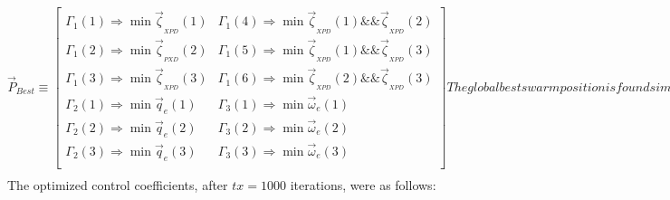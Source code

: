 \begin{subequations}
\begin{equation}
\vec{P}_{Best}\equiv
\begin{bmatrix}
\Gamma_1(1)\Rightarrow \min \vec{\zeta}_{_{XPD}}(1) & \Gamma_1(4)\Rightarrow\min\vec{\zeta}_{_{XPD}}(1)\&\& \vec{\zeta}_{_{XPD}}(2)\\
\Gamma_1(2)\Rightarrow \min \vec{\zeta}_{_{PXD}}(2) & \Gamma_1(5)\Rightarrow\min\vec{\zeta}_{_{XPD}}(1)\&\& \vec{\zeta}_{_{XPD}}(3)\\
\Gamma_1(3)\Rightarrow \min \vec{\zeta}_{_{XPD}}(3) & \Gamma_1(6)\Rightarrow\min\vec{\zeta}_{_{XPD}}(2)\&\& \vec{\zeta}_{_{XPD}}(3)\\
\Gamma_2(1)\Rightarrow \min \vec{q}_e(1) & \Gamma_3(1)\Rightarrow\min\vec{\omega}_e(1)\\
\Gamma_2(2)\Rightarrow \min \vec{q}_e(2) & \Gamma_3(2)\Rightarrow\min\vec{\omega}_e(2)\\
\Gamma_2(3)\Rightarrow \min \vec{q}_e(3) & \Gamma_3(3)\Rightarrow\min\vec{\omega}_e(3)\\
\end{bmatrix}
\end{equation}
The global best swarm position is found similarly:
\begin{equation}
\vec{G}_{Best}\equiv
\begin{bmatrix}
\Gamma_1(1)\Rightarrow \min \vec{\zeta}_{_{XPD}}(1) & \Gamma_1(4)\Rightarrow\min\vec{\zeta}_{_{XPD}}(1)\&\& \vec{\zeta}_{_{XPD}}(2)\\
\Gamma_1(2)\Rightarrow \min \vec{\zeta}_{_{PXD}}(2) & \Gamma_1(5)\Rightarrow\min\vec{\zeta}_{_{XPD}}(1)\&\& \vec{\zeta}_{_{XPD}}(3)\\
\Gamma_1(3)\Rightarrow \min \vec{\zeta}_{_{XPD}}(3) & \Gamma_1(6)\Rightarrow\min\vec{\zeta}_{_{XPD}}(2)\&\& \vec{\zeta}_{_{XPD}}(3)\\
\Gamma_2(1)\Rightarrow \min \vec{\zeta}_{_{XPD}}(1) & \Gamma_3(1)\Rightarrow\min\vec{\zeta}_{_{XPD}}(1)\\
\Gamma_2(2)\Rightarrow \min \vec{\zeta}_{_{XPD}}(2) & \Gamma_3(2)\Rightarrow\min\vec{\zeta}_{_{XPD}}(2)\\
\Gamma_2(3)\Rightarrow \min \vec{\zeta}_{_{XPD}}(3) & \Gamma_3(3)\Rightarrow\min\vec{\zeta}_{_{XPD}}(3)\\
\end{bmatrix}
\end{equation}
\end{subequations} 
The optimized control coefficients, after $tx=1000$ iterations, were as follows:
